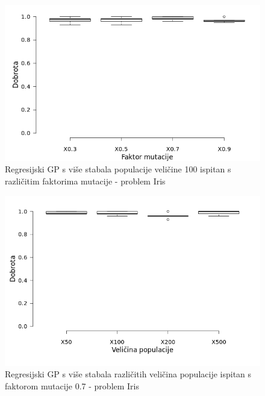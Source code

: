 \documentclass[times, utf8, zavrsni]{fer}
\begin{document}
\begin{figure}[htb]
\centering
\includegraphics[scale=0.5]{grafovi/boxplotIrisMTest}
\caption{Regresijski GP s više stabala populacije veličine 100 ispitan s različitim faktorima mutacije - problem Iris}
\end{figure}

\begin{figure}[htb]
\centering
\includegraphics[scale=0.5]{grafovi/boxplotIrisM}
\caption{Regresijski GP s više stabala različitih veličina populacije ispitan s faktorom mutacije 0.7 - problem Iris}
\end{figure}
\end{document}
